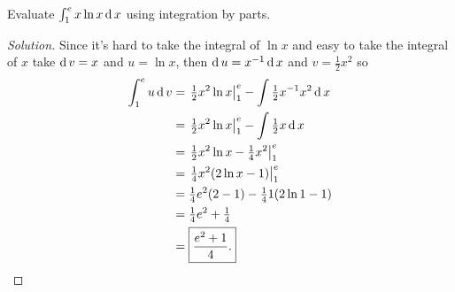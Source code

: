 \begin{problem}
Evaluate $\int_1^e x\ln x\operatorname{d} x$ using integration by parts.
\end{problem}
\begin{proof}[Solution]
Since it's hard to take the integral of $\ln x$ and easy to take the
integral of $x$ take $\operatorname{d} v=x$ and $u=\ln x$, then $\operatorname{d} u=x^{-1}\operatorname{d}
x$ and $v=\tfrac{1}{2}x^2$ so
\begingroup
\allowdisplaybreaks
\begin{align*}
\int_1^e u\operatorname{d} v
&=\left.\tfrac{1}{2}x^2\ln x\right|_1^e
-\int\tfrac{1}{2}x^{-1}x^2\operatorname{d} x\\
&=\left.\tfrac{1}{2}x^2\ln x\right|_1^e
-\int\tfrac{1}{2}x\operatorname{d} x\\
&=\left.\tfrac{1}{2}x^2\ln x-\tfrac{1}{4}x^2\right|_1^e\\
&=\left.\tfrac{1}{4}x^2(2\ln x-1)\right|_1^e\\
&=\tfrac{1}{4}e^2(2-1)-\tfrac{1}{4}1(2\ln 1-1)\\
&=\tfrac{1}{4}e^2+\tfrac{1}{4}\\
&=\boxed{\frac{e^2+1}{4}.}\qedhere
\end{align*}
\endgroup
\end{proof}

